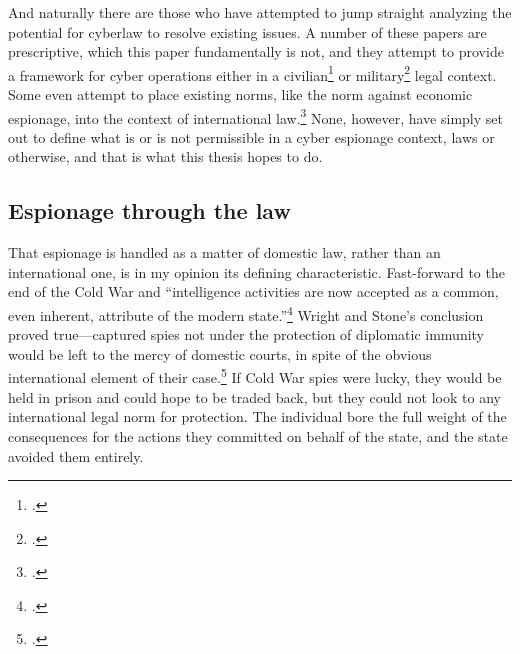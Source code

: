 \documentclass{memoir}
\begin{document}
\begin{refsegment}
And naturally there are those who have attempted to jump straight analyzing the potential for cyberlaw to resolve existing issues. A number of these papers are prescriptive, which this paper fundamentally is not, and they attempt to provide a framework for cyber operations either in a civilian\footcite{yurcik_internet_2001} or military\footcite{kehler_rules_2017} legal context. Some even attempt to place existing norms, like the norm against economic espionage, into the context of international law.\footcite{lotrionte_countering_2015} None, however, have simply set out to define what is or is not permissible in a cyber espionage context, laws or otherwise, and that is what this thesis hopes to do.


\subsection{Espionage through the law}

That espionage is handled as a matter of domestic law, rather than an international one, is in my opinion its defining characteristic. Fast-forward to the end of the Cold War and ``intelligence activities are now accepted as a common, even inherent, attribute of the modern state.''\footcite[p.~321]{demarest_espionage_1995} Wright and Stone's conclusion proved true---captured spies not under the protection of diplomatic immunity would be left to the mercy of domestic courts, in spite of the obvious international element of their case.\footcite[p.~330]{demarest_espionage_1995} If Cold War spies were lucky, they would be held in prison and could hope to be traded back, but they could not look to any international legal norm for protection.  The individual bore the full weight of the consequences for the actions they committed on behalf of the state, and the state avoided them entirely.


\end{refsegment}
\end{document}
